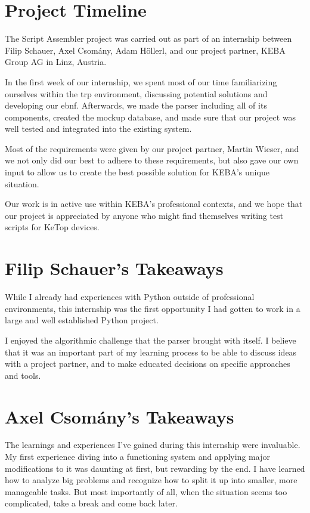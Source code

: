 
\section*{Project Timeline}

The Script Assembler project was carried out as part of an internship between Filip Schauer, Axel Csomány, Adam Höllerl, and our project partner, KEBA Group AG in Linz, Austria. 

In the first week of our internship, we spent most of our time familiarizing ourselves within the \gls{trp} environment, discussing potential solutions and developing our \gls{ebnf}. Afterwards, we made the parser including all of its components, created the mockup database, and made sure that our project was well tested and integrated into the existing system.

Most of the requirements were given by our project partner, Martin Wieser, and we not only did our best to adhere to these requirements, but also gave our own input to allow us to create the best possible solution for KEBA's unique situation.

Our work is in active use within KEBA's professional contexts, and we hope that our project is appreciated by anyone who might find themselves writing test scripts for KeTop devices.

\section*{Filip Schauer's Takeaways}

While I already had experiences with Python outside of professional environments, this internship was the first opportunity I had gotten to work in a large and well established Python project. 

I enjoyed the algorithmic challenge that the parser brought with itself. I believe that it was an important part of my learning process to be able to discuss ideas with a project partner, and to make educated decisions on specific approaches and tools.

\section*{Axel Csomány's Takeaways}

The learnings and experiences I've gained during this internship were invaluable. My first experience diving into a functioning system and applying major modifications to it was daunting at first, but rewarding by the end. I have learned how to analyze big problems and recognize how to split it up into smaller, more manageable tasks. But most importantly of all, when the situation seems too complicated, take a break and come back later. 

